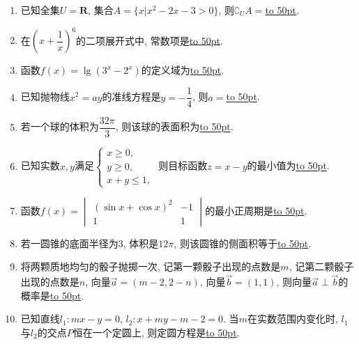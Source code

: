 \documentclass[10pt,a4paper]{article}
\newcommand{\blank}[1]{\underline{\hbox to #1pt{}}}
\begin{document}
\begin{enumerate}[1.]
\item 已知全集$U=\mathbf{R}$, 集合$A=\{x|x^2-2x-3>0\}$, 则$\complement_U A=$\blank{50}.
\item 在$(x+\dfrac1x)^6$的二项展开式中, 常数项是\blank{50}.
\item 函数$f(x)=\lg (3^x-2^x)$的定义域为\blank{50}.
\item 已知抛物线$x^2=ay$的准线方程是$y=-\dfrac14$, 则$a=$\blank{50}.
\item 若一个球的体积为$\dfrac{32\pi}3$, 则该球的表面积为\blank{50}.
\item 已知实数$x,y$满足$\begin{cases} x\ge 0, \\ y\ge 0, \\ x+y\le 1, \end{cases}$ 则目标函数$z=x-y$的最小值为\blank{50}.
\item 函数$f(x)=\begin{vmatrix} (\sin x+\cos x)^2 & -1 \\ 1 & 1 \end{vmatrix}$的最小正周期是\blank{50}.
\item 若一圆锥的底面半径为$3$, 体积是$12\pi$, 则该圆锥的侧面积等于\blank{50}.
\item 将两颗质地均匀的骰子抛掷一次, 记第一颗骰子出现的点数是$m$, 记第二颗骰子出现的点数是$n$, 向量$\overrightarrow a=(m-2,2-n)$, 向量$\overrightarrow b=(1,1)$, 则向量$\overrightarrow a\perp \overrightarrow b$的概率是\blank{50}.
\item 已知直线$l_1:mx-y=0$, $l_2:x+my-m-2=0$. 当$m$在实数范围内变化时, $l_1$与$l_2$的交点$P$恒在一个定圆上, 则定圆方程是\blank{50}.



\end{enumerate}
\end{document}

